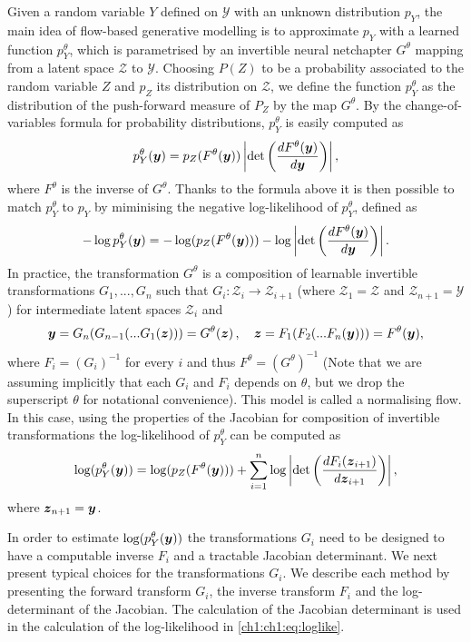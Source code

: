 Given a random variable $Y$ defined on $\mathcal{Y}$ with an unknown distribution $p_Y$, the main idea of flow-based generative modelling is to approximate $p_Y$ with a learned function $p^\theta_Y$, which is parametrised by an invertible neural netchapter $G^\theta$ mapping from a latent space $\mathcal{Z}$ to $\mathcal{Y}$. 
Choosing $P(Z)$ to be a probability associated to the random variable $Z$ and $p_Z$ its distribution on $\mathcal{Z}$, we define the function $p^\theta_Y$ as the distribution of the push-forward measure of $P_Z$ by the map $G^\theta$.
By the change-of-variables formula for probability distributions, $p^\theta_Y$ is easily computed as
\begin{align*}
p^\theta_Y(\boldsymbol{y}) = p_Z(F^\theta(\boldsymbol{y})) \left| \det \left(\frac{d F^\theta(\boldsymbol{y})}{d\boldsymbol{y}} \right)\right|,
\end{align*}
where $F^\theta$ is the inverse of $G^\theta$.
Thanks to the formula above it is then possible to match $p^\theta_Y$ to $p_Y$ by miminising the negative log-likelihood of $p^\theta_Y$, defined as
\begin{align*}
- \log p^\theta_Y(\boldsymbol{y}) = -  \log(p_Z(F^\theta(\boldsymbol{y}))) -  \log\left| \det \left(\frac{d F^\theta(\boldsymbol{y})}{d\boldsymbol{y}} \right)\right|.
\end{align*}
In practice, the transformation $G^\theta$ is a composition of learnable invertible transformations $G_{1}, ..., G_{n}$ such that $G_i : \mathcal{Z}_{i} \rightarrow \mathcal{Z}_{i+1}$ (where $\mathcal{Z}_1 = \mathcal{Z}$ and $\mathcal{Z}_{n+1} = \mathcal{Y}$) for intermediate latent spaces $\mathcal{Z}_i$ and
\begin{equation}
    \boldsymbol{y} = G_{n}(G_{n-1}(...G_{1}(\boldsymbol{z})))=G^{\theta}(\boldsymbol{z})\,, \quad  \boldsymbol{z}= F_1(F_{2}(...F_n(\boldsymbol{y})))=F^{\theta}(\boldsymbol{y}),
\end{equation}
where $F_i = (G_i)^{-1}$ for every $i$ and thus $F^\theta = (G^\theta)^{-1}$ (Note that we are assuming implicitly that each $G_i$ and $F_i$ depends on $\theta$, but we drop the superscript $\theta$ for notational convenience). This model is called a normalising flow.
In this case, using the properties of the Jacobian for composition of invertible transformations the log-likelihood of $p^\theta_Y$ can be computed as 
\begin{equation}\label{ch1:ch1:eq:loglike}
\log(p^\theta_Y(\boldsymbol{y}) ) = \log(p_Z(F^\theta(\boldsymbol{y}))) + \sum_{i=1}^{n}  \log\left| \det \left(\frac{d{F_i}(\boldsymbol{z}_{i+1})}{d\boldsymbol{z}_{i+1}} \right)\right|,
\end{equation}
where $\boldsymbol{z}_{n+1} = \boldsymbol{y}$.


In order to estimate $\log(p^\theta_Y(\boldsymbol{y}) )$ the transformations $G_i$ need to be designed to have a computable inverse $F_i$ and a tractable Jacobian determinant. 
We next present typical choices for the transformations $G_i$. We describe each method by presenting the forward transform $G_i$, the inverse transform $F_i$ and the  log-determinant of the Jacobian. The calculation of the Jacobian determinant is used in the calculation of the log-likelihood in \eqref{ch1:ch1:eq:loglike}.
\color{black}

